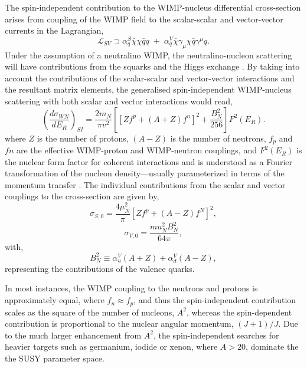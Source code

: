 {The spin-independent contribution to the WIMP-nucleus differential cross-section arises from coupling of the WIMP field to the scalar-scalar and vector-vector currents in the Lagrangian,
%
\begin{equation} \label{eq:scalar_vector_lag}
   \mathcal{L}_{SV} \supset \alpha^{S}_{q} \bar{\chi} \chi \bar{q}q \; + \; \alpha^{V}_{q} \bar{\chi} \gamma_{\mu} \chi \bar{q} \gamma^{\mu}q.
\end{equation}
%
Under the assumption of a neutralino WIMP, the neutralino-nucleon scattering will have contributions from the squarks and the Higgs exchange \cite{Jungman_1996}. By taking into account the contributions of the scalar-scalar and vector-vector interactions and the resultant matrix elements, the generalised spin-independent WIMP-nucleus scattering with both scalar and vector interactions would read,
%
\begin{equation} \label{eq:si_rate}
   	\left(\frac{d\sigma_{WN}}{dE_{R}}\right)_{SI} = \frac{2m_{N}}{\pi{}v^{2}}\left[[Zf^{p} + (A + Z)f^{n}]^2 + \frac{B^{2}_{N}}{256}\right] F^{2}(E_{R}).
\end{equation}
%
where $Z$ is the number of protons, $(A-Z)$ is the number of neutrons, $f_{p}$ and $f{n}$ are the effective WIMP-proton and WIMP-neutron couplings, and $F^2(E_{R})$ is the nuclear form factor for coherent interactions and is understood as a Fourier transformation of the nucleon density---usually parameterized in terms of the momentum transfer \cite{nuclear_form_wimp}. The individual contributions from the scalar and vector couplings to the cross-section are given by,
%
\begin{equation} \label{eq:scalar_vector_contributions}
   	\sigma_{S,0} = \frac{4\mu^{2}_{N}}{\pi}[Zf^{p} + (A-Z)f^{N}]^2,
\end{equation}
%
%
\begin{equation} \label{eq:scalar_vector_contributions}
   	\sigma_{V,0} = \frac{mu^{2}_{N}B^{2}_{N}}{64\pi},
\end{equation}
%
with,
%
\begin{equation} \label{eq:scalar_vector_contributions}
   	B^{2}_{N} \equiv \alpha^{V}_{u}(A+Z) + \alpha^{V}_{d}(A-Z),
\end{equation}
%
representing the contributions of the valence quarks.

In most instances, the WIMP coupling to the neutrons and protons is approximately equal, where $f_{n} \approx f_{p}$, and thus the spin-independent contribution scales as the square of the number of nucleons, $A^2$, whereas the spin-dependent contribution is proportional to the nuclear angular momentum, $(J+1)/J$. Due to the much larger enhancement from $A^2$, the spin-independent searches for heavier targets such as germanium, iodide or xenon, where $A>20$, dominate the the SUSY parameter space.

}

